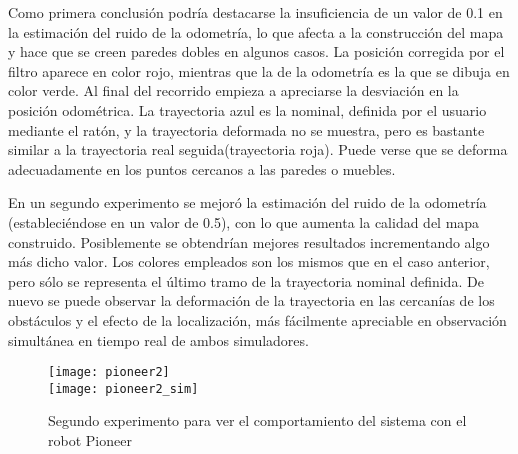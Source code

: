  Como primera conclusión podría destacarse la insuficiencia de un valor de 0.1 en la estimación del ruido de la odometría, lo que afecta a la construcción del mapa y hace que se creen paredes dobles en algunos casos. La posición corregida por el filtro aparece en color rojo, mientras que la de la odometría es la que se dibuja en color verde. Al final del recorrido empieza a apreciarse la desviación en la posición odométrica. La trayectoria azul es la nominal, definida por el usuario mediante el ratón, y la trayectoria deformada no se muestra, pero es bastante similar a la trayectoria real seguida(trayectoria roja). Puede verse que se deforma adecuadamente en los puntos cercanos a las paredes o muebles.
 
 En un segundo experimento se mejoró la estimación del ruido de la odometría (estableciéndose en un valor de 0.5), con lo que aumenta la calidad del mapa construido. Posiblemente se obtendrían mejores resultados incrementando algo más dicho valor. Los colores empleados son los mismos que en el caso anterior, pero sólo se representa el último tramo de la trayectoria nominal definida. De nuevo se puede observar la deformación de la trayectoria en las cercanías de los obstáculos y el efecto de la localización, más fácilmente apreciable en observación simultánea en tiempo real de ambos simuladores.
 
 \begin{figure}[h]
  \centering\texttt{[image: pioneer2]}\\
  \hspace{0.5cm}\texttt{[image: pioneer2\_sim]}
  \caption{Segundo experimento para ver el comportamiento del sistema con el robot Pioneer}\label{fg:pioneerSim1}
\end{figure}